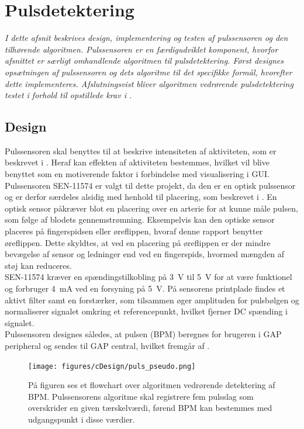 \section{Pulsdetektering}\label{sec_de_im_te_puls}
\textit{I dette afsnit beskrives design, implementering og testen af pulssensoren og den tilhørende algoritmen. Pulssensoren er en færdigudviklet komponent, hvorfor afsnittet er særligt omhandlende algoritmen til pulsdetektering. Først designes opsætningen af pulssensoren og dets algoritme til det specifikke formål, hvorefter dette implementeres. Afslutningsvist bliver algoritmen vedrørende pulsdetektering testet i forhold til opstillede krav i .}

\subsection{Design} \label{sec_design_puls}
Pulssensoren skal benyttes til at beskrive intensiteten af aktiviteten, som er beskrevet i . Heraf kan effekten af aktiviteten bestemmes, hvilket vil blive benyttet som en motiverende faktor i forbindelse med visualisering i GUI. \newline
Pulssensoren SEN-11574 er valgt til dette projekt, da den er en optisk pulssensor og er derfor særdeles alsidig med henhold til placering, som beskrevet i . En optisk sensor påkræver blot en placering over en arterie for at kunne måle pulsen, som følge af blodets gennemstrømning. Eksempelvis kan den optiske sensor placeres på fingerspidsen eller øreflippen, hvoraf denne rapport benytter øreflippen. Dette skyldtes, at ved en placering på øreflippen er der mindre bevægelse af sensor og ledninger end ved en fingerspids, hvormed mængden af støj kan reduceres. \\
SEN-11574 kræver en spændingstilkobling på 3~V til 5~V for at være funktionel og forbruger 4~mA ved en forsyning på 5~V. På sensorens printplade findes et aktivt filter samt en forstærker, som tilsammen øger amplituden for pulsbølgen og normaliserer signalet omkring et referencepunkt, hvilket fjerner DC spænding i signalet. \citep{Murphy2016,Murphy2016_sensor}\\
Pulssensoren designes således, at pulsen (BPM) beregnes for brugeren i GAP peripheral og sendes til GAP central, hvilket fremgår af .
\begin{figure}[H]
	\centering
	\texttt{[image: figures/cDesign/puls\_pseudo.png]}
	\caption{På figuren ses et flowchart over algoritmen vedrørende detektering af BPM. Pulssensorens algoritme skal registrere fem pulsslag som overskrider en given tærskelværdi, førend BPM kan bestemmes med udgangspunkt i disse værdier.}
	\label{fig:puls_pseudo}
\end{figure}
